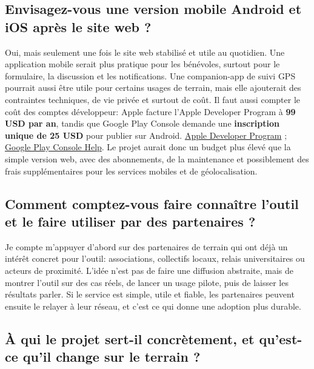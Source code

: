 \documentclass[
  10pt,
  a4paper,
  DIV=11,
  numbers=noendperiod,
  oneside]{scrreprt}
\let\oldtextbf\textbf
\renewcommand{\textbf}[1]{\oldtextbf{\textcolor{cmmnavy}{#1}}}
\begin{document}
\subsection{Envisagez-vous une version mobile Android et iOS après le
site web
?}\label{envisagez-vous-une-version-mobile-android-et-ios-apruxe8s-le-site-web}

Oui, mais seulement une fois le site web stabilisé et utile au
quotidien. Une application mobile serait plus pratique pour les
bénévoles, surtout pour le formulaire, la discussion et les
notifications. Une companion-app de suivi GPS pourrait aussi être utile
pour certains usages de terrain, mais elle ajouterait des contraintes
techniques, de vie privée et surtout de coût. Il faut aussi compter le
coût des comptes développeur: Apple facture l'Apple Developer Program à
\textbf{99 USD par an}, tandis que Google Play Console demande une
\textbf{inscription unique de 25 USD} pour publier sur Android.
\href{https://developer.apple.com/help/account/membership/program-enrollment}{Apple
Developer Program} ;
\href{https://support.google.com/googleplay/android-developer/answer/6112435?hl=en-EN}{Google
Play Console Help}. Le projet aurait donc un budget plus élevé que la
simple version web, avec des abonnements, de la maintenance et
possiblement des frais supplémentaires pour les services mobiles et de
géolocalisation.

\subsection{Comment comptez-vous faire connaître l'outil et le faire
utiliser par des partenaires
?}\label{comment-comptez-vous-faire-connauxeetre-loutil-et-le-faire-utiliser-par-des-partenaires}

Je compte m'appuyer d'abord sur des partenaires de terrain qui ont déjà
un intérêt concret pour l'outil: associations, collectifs locaux, relais
universitaires ou acteurs de proximité. L'idée n'est pas de faire une
diffusion abstraite, mais de montrer l'outil sur des cas réels, de
lancer un usage pilote, puis de laisser les résultats parler. Si le
service est simple, utile et fiable, les partenaires peuvent ensuite le
relayer à leur réseau, et c'est ce qui donne une adoption plus durable.

\subsection{À qui le projet sert-il concrètement, et qu'est-ce qu'il
change sur le terrain
?}\label{uxe0-qui-le-projet-sert-il-concruxe8tement-et-quest-ce-quil-change-sur-le-terrain}
\end{document}
